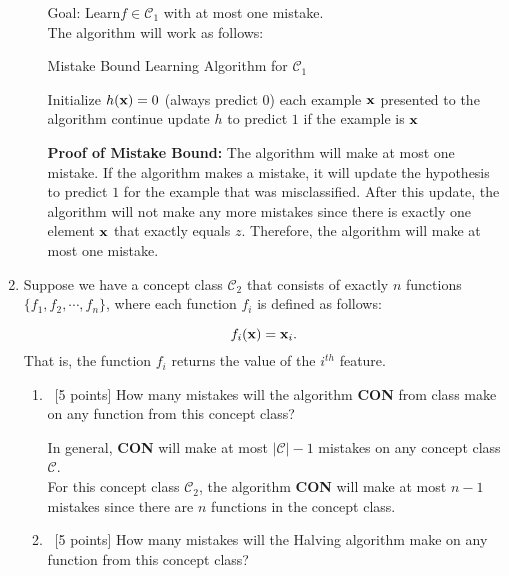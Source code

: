 \begin{enumerate}
\begin{enumerate}
  {\color{red}
    Goal: Learn$f \in \mathcal{C}_1$ with at most one mistake. \\
    The algorithm will work as follows:

    \begin{algorithm}[H]
      \caption{Mistake Bound Learning Algorithm for $\mathcal{C}_1$}
      \begin{algorithmic}[1]
        \State Initialize $h({\bf x}) = 0$ (always predict $0$)
        \For each example ${\bf x}$ presented to the algorithm
        \State continue
        \EndIf
        \State update $h$ to predict $1$ if the example is ${\bf x}$
        \EndIf
        \EndFor
      \end{algorithmic}
    \end{algorithm}

    \textbf{Proof of Mistake Bound:} The algorithm will make at most one mistake. If the algorithm makes a mistake, it will update the hypothesis to predict $1$ for the example that was misclassified. After this update, the algorithm will not make any more mistakes since there is exactly one element ${\bf x}$ that exactly equals $z$. Therefore, the algorithm will make at most one mistake.
  }

  \end{enumerate}

\item Suppose we have a concept class $\mathcal{C}_2$ that consists
  of exactly $n$ functions $\{f_1, f_2, \cdots, f_n\}$, where each
  function $f_i$ is defined as follows:

  \begin{equation*}
    f_i({\bf x}) = {\bf x}_i.
  \end{equation*}
  That is, the function $f_i$ returns the value of the $i^{th}$
  feature.

  \begin{enumerate}
  \item~[5 points] How many mistakes will the algorithm
    \textbf{CON} from class make on any function from this concept
    class?

    {\color{red}
      In general, \textbf{CON} will make at most $|\mathcal{C}|-1$ mistakes on any concept class $\mathcal{C}$.\\
      For this concept class $\mathcal{C}_2$, the algorithm \textbf{CON} will make at most $n-1$ mistakes since there are $n$ functions in the concept class.
    }

  \item~[5 points] How many mistakes will the Halving algorithm make
    on any function from this concept class?


\end{enumerate}
\end{enumerate}
